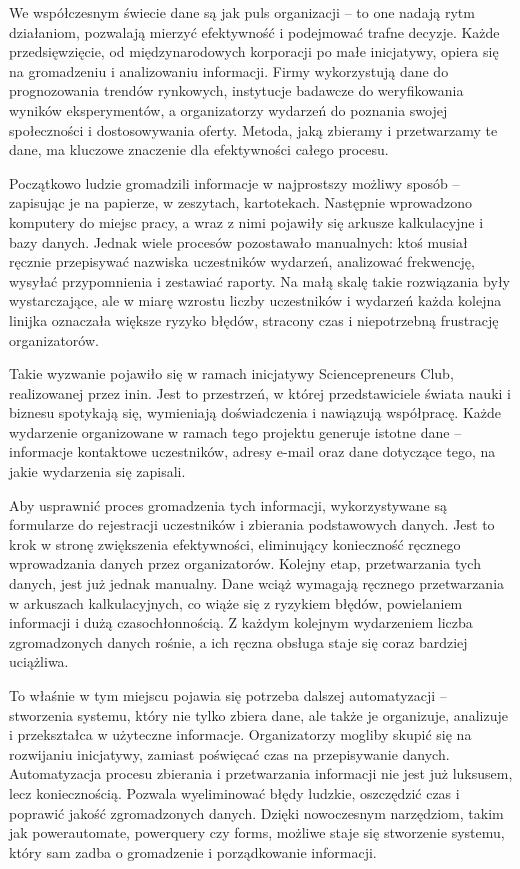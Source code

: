 We współczesnym świecie dane są jak puls organizacji – to one nadają rytm działaniom, pozwalają mierzyć efektywność i podejmować trafne decyzje. Każde przedsięwzięcie, od międzynarodowych korporacji po małe inicjatywy, opiera się na gromadzeniu i analizowaniu informacji. Firmy wykorzystują dane do prognozowania trendów rynkowych, instytucje badawcze do weryfikowania wyników eksperymentów, a organizatorzy wydarzeń do poznania swojej społeczności i dostosowywania oferty. Metoda, jaką zbieramy i przetwarzamy te dane, ma kluczowe znaczenie dla efektywności całego procesu.~\parencite[s. 13]{gontar2019} 

Początkowo ludzie gromadzili informacje w najprostszy możliwy sposób – zapisując je na papierze, w zeszytach, kartotekach. Następnie wprowadzono komputery do miejsc pracy, a wraz z nimi pojawiły się arkusze kalkulacyjne i bazy danych. Jednak wiele procesów pozostawało manualnych: ktoś musiał ręcznie przepisywać nazwiska uczestników wydarzeń, analizować frekwencję, wysyłać przypomnienia i zestawiać raporty. Na małą skalę takie rozwiązania były wystarczające, ale w miarę wzrostu liczby uczestników i wydarzeń każda kolejna linijka oznaczała większe ryzyko błędów, stracony czas i niepotrzebną frustrację organizatorów.

Takie wyzwanie pojawiło się w ramach inicjatywy Sciencepreneurs Club, realizowanej przez \gls{inin}. Jest to przestrzeń, w której przedstawiciele świata nauki i biznesu spotykają się, wymieniają doświadczenia i nawiązują współpracę. Każde wydarzenie organizowane w ramach tego projektu generuje istotne dane – informacje kontaktowe uczestników, adresy e-mail oraz dane dotyczące tego, na jakie wydarzenia się zapisali.

Aby usprawnić proces gromadzenia tych informacji, wykorzystywane są formularze do rejestracji uczestników i zbierania podstawowych danych. Jest to krok w stronę zwiększenia efektywności, eliminujący konieczność ręcznego wprowadzania danych przez organizatorów. Kolejny etap, przetwarzania tych danych, jest już jednak manualny. Dane wciąż wymagają ręcznego przetwarzania w arkuszach kalkulacyjnych, co wiąże się z ryzykiem błędów, powielaniem informacji i dużą czasochłonnością. Z każdym kolejnym wydarzeniem liczba zgromadzonych danych rośnie, a ich ręczna obsługa staje się coraz bardziej uciążliwa.

To właśnie w tym miejscu pojawia się potrzeba dalszej automatyzacji – stworzenia systemu, który nie tylko zbiera dane, ale także je organizuje, analizuje i przekształca w użyteczne informacje. Organizatorzy mogliby skupić się na rozwijaniu inicjatywy, zamiast poświęcać czas na przepisywanie danych. Automatyzacja procesu zbierania i przetwarzania informacji nie jest już luksusem, lecz koniecznością. Pozwala wyeliminować błędy ludzkie, oszczędzić czas i poprawić jakość zgromadzonych danych. Dzięki nowoczesnym narzędziom, takim jak \gls{powerautomate}, \gls{powerquery} czy \gls{forms}, możliwe staje się stworzenie systemu, który sam zadba o gromadzenie i porządkowanie informacji.

